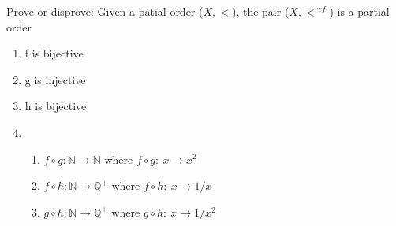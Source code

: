 \documentclass[12pt]{article}
\newcommand{\N}{\mathbb{N}}
\newcommand{\Q}{\mathbb{Q}}
\newenvironment{solution}[2][Solution]{ \begin{trivlist}
\item[\hskip \labelsep {\bfseries #1}]}{\end{trivlist}}
\newenvironment{problem}[2][Problem]{\begin{trivlist}
\item[\hskip \labelsep {\bfseries #1}\hskip \labelsep {\bfseries #2.}]}{\end{trivlist}}
\begin{document}
\vskip 0.5in

\begin{problem}{6}Prove or disprove: Given a patial order ($X,<$), the pair ($X,<^{ref}$) is a partial order

\end{problem}
\begin{solution}{6}
\item[]
\begin{enumerate}[label=\alph*)]
    \item f is bijective
    \item g is injective
    \item h is bijective
    \item 
    \begin{enumerate}[label=(\roman*)]
        \item $f \circ g \colon \N \longrightarrow \N$ where $ f \circ g \colon \ x \longrightarrow x^2$
        \item $f \circ h \colon \N \longrightarrow \Q^+$ where $ f \circ h \colon \ x \longrightarrow 1/x$
        \item $g \circ h \colon \N \longrightarrow \Q^+$ where $ g \circ h \colon \ x \longrightarrow 1/x^2$
    \end{enumerate}
\end{enumerate}
\end{solution}

\pagebreak
\end{document}
